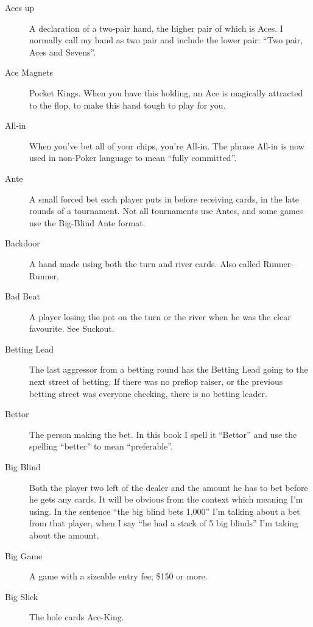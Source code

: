 \begin{description}

\item[Aces up] A declaration of a two-pair hand, the higher pair of
which is Aces. I normally call my hand as two pair and include the
lower pair: ``Two pair, Aces and Sevens''.

\item[Ace Magnets] Pocket Kings. When you have this holding, an Ace is
magically attracted to the flop, to make this hand tough to play for
you.

\item[All-in] When you've bet all of your chips, you're All-in. The
phrase All-in is now used in non-Poker language to mean ``fully
committed''.

\item[Ante] A small forced bet each player puts in before receiving
cards, in the late rounds of a tournament. Not all tournaments use
Antes, and some games use the Big-Blind Ante format.

\item[Backdoor] A hand made using both the turn and river cards. Also
called Runner-Runner.

\item[Bad Beat] A player losing the pot on the turn or the river when
he was the clear favourite. See Suckout.

\item[Betting Lead] The last aggressor from a betting round has the
Betting Lead going to the next street of betting. If there was no
preflop raiser, or the previous betting street was everyone checking,
there is no betting leader.

\item[Bettor] The person making the bet. In this book I spell it ``Bettor''
and use the spelling ``better'' to mean ``preferable''.

\item[Big Blind] Both the player two left of the dealer and the amount
he has to bet before he gets any cards. It will be obvious from the
context which meaning I'm using. In the sentence ``the big blind bets
1,000'' I'm talking about a bet from that player, when I say ``he had
a stack of 5 big blinds'' I'm taking about the amount.

\item[Big Game] A game with a sizeable entry fee; \$150 or more.

\item[Big Slick] The hole cards Ace-King.


\end{description}
